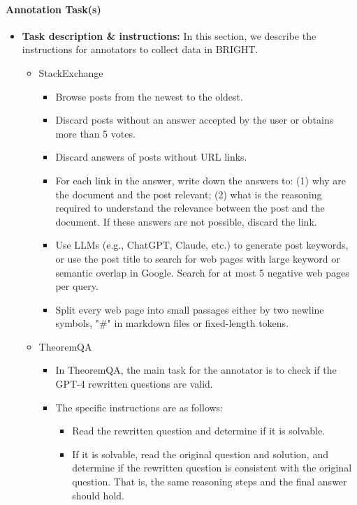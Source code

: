 \paragraph{Annotation Task(s)}
    \begin{itemize}
        \item \textbf{Task description \& instructions:}
        In this section, we describe the instructions for annotators to collect data in BRIGHT.
        \begin{itemize}
            \item StackExchange
            \begin{itemize}
                \item Browse posts from the newest to the oldest.
                \item Discard posts without an answer accepted by the user or obtains more than 5 votes.
                \item Discard answers of posts without URL links.
                \item For each link in the answer, write down the answers to: (1) why are the document and the post relevant; (2) what is the reasoning required to understand the relevance between the post and the document. If these answers are not possible, discard the link.
                \item Use LLMs (e.g., ChatGPT, Claude, etc.) to generate post keywords, or use the post title to search for web pages with large keyword or semantic overlap in Google. Search for at most 5 negative web pages per query.
                \item Split every web page into small passages either by two newline symbols, "\#" in markdown files or fixed-length tokens.
            \end{itemize}
            \item TheoremQA
            \begin{itemize}
                \item In TheoremQA, the main task for the annotator is to check if the GPT-4 rewritten questions are valid.
                \item The specific instructions are as follows:
                \begin{itemize}
                    \item Read the rewritten question and determine if it is solvable.
                    \item If it is solvable, read the original question and solution, and determine if the rewritten question is consistent with the original question. That is, the same reasoning steps and the final answer should hold.

\end{itemize}
\end{itemize}
\end{itemize}
\end{itemize}
